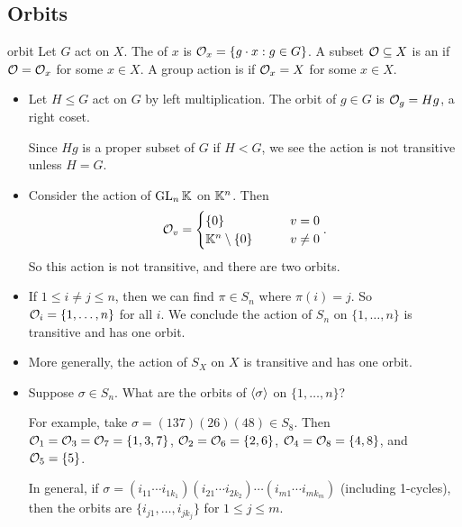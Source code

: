 \documentclass[12pt,letterpaper]{report}
\begin{document}
\subsection{Orbits}

\begin{defn}{orbit}{}
  Let $G$ act on $X$.
  The  of $x$ is $\mathcal{O}_x = \{g \cdot x : g \in G\}$.
  A subset $\mathcal{O} \subseteq X$ is an  if $\mathcal{O} = \mathcal{O}_x$ for some $x \in X$.
  A group action is  if $\mathcal{O}_x = X$ for some $x \in X$.
\end{defn}

\begin{ex}
  \begin{itemize}
    \item Let $H \leq G$ act on $G$ by left multiplication.
    The orbit of $g \in G$ is $\mathcal{O}_g = Hg$, a right coset.

    Since $Hg$ is a proper subset of $G$ if $H < G$, we see the action is not transitive unless
    $H = G$.
    \item Consider the action of $\operatorname{GL}_n\mathbb{K}$ on $\mathbb{K}^n$.
    Then
    \[
      \mathcal{O}_v = \begin{cases}
        \{0\} & v = 0 \\
        \mathbb{K}^n \setminus \{0\} \qquad & v \neq 0
      \end{cases}.
    \]
    So this action is not transitive, and there are two orbits.
    \item If $1 \leq i \neq j \leq n$, then we can find $\pi \in S_n$ where $\pi(i) = j$.
    So $\mathcal{O}_i = \{1, \ldots, n\}$ for all $i$.
    We conclude the action of $S_n$ on $\{1, \ldots, n\}$ is transitive and has one orbit.
    \item More generally, the action of $S_X$ on $X$ is transitive and has one orbit.
    \item Suppose $\sigma \in S_n$.
    What are the orbits of $\langle\sigma\rangle$ on $\{1, \ldots, n\}$?

    For example, take $\sigma = (137)(26)(48) \in S_8$.
    Then $\mathcal{O}_1 = \mathcal{O}_3 = \mathcal{O}_7 = \{1, 3, 7\}$, $\mathcal{O}_2 = \mathcal{O}_6 = \{2, 6\}$,
    $\mathcal{O}_4 = \mathcal{O}_8 = \{4, 8\}$, and $\mathcal{O}_5 = \{5\}$.

    In general, if
    $\sigma = (i_{11} \cdots i_{1k_1})(i_{21} \cdots i_{2k_2}) \cdots (i_{m1} \cdots i_{mk_m})$
    (including 1-cycles), then the orbits are $\{i_{j1}, \ldots, i_{jk_j}\}$ for $1 \leq j \leq m$.
  \end{itemize}
\end{ex}
\end{document}
